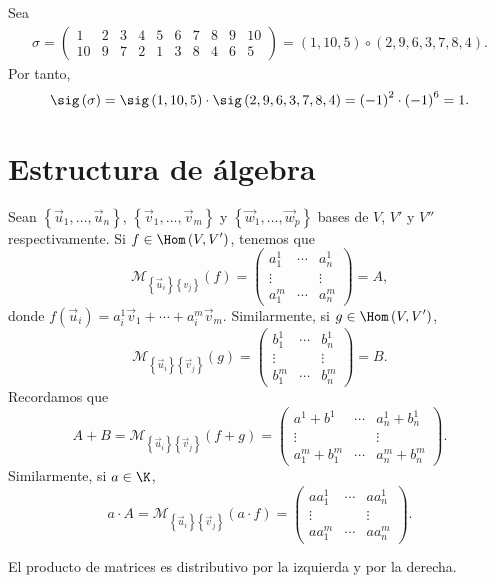 \begin{eg}
\normalfont Sea
\[
\begin{split}
	\sigma = \begin{pmatrix} 1 & 2 & 3 & 4 & 5 & 6 & 7 & 8 & 9 & 10 \\
	10 & 9 & 7 & 2 & 1 & 3 & 8 & 4 & 6 & 5\end{pmatrix} = \left(1, 10, 5\right) \circ \left(2, 9, 6, 3, 7, 8, 4\right) .
\end{split}
\]
Por tanto, 
\[\sig\left(\sigma \right) = \sig\left(1, 10, 5\right) \cdot \sig\left(2, 9, 6, 3, 7, 8, 4\right) = \left(-1\right)^{2} \cdot \left(-1\right)^{6} = 1 .\]
\end{eg}

\section{Estructura de álgebra}

Sean $\displaystyle \left\{ \vec{u}_{1}, \ldots, \vec{u}_{n}\right\}  $, $\displaystyle \left\{ \vec{v}_{1}, \ldots, \vec{v}_{m}\right\}  $ y $\displaystyle \left\{ \vec{w}_{1}, \ldots, \vec{w}_{p}\right\}  $ bases de $\displaystyle V$, $\displaystyle V' $ y $\displaystyle V'' $ respectivamente. Si $\displaystyle f \in \Hom\left(V, V'\right) $, tenemos que 
\[\mathcal{M}_{ \left\{ \vec{u}_{i}\right\} \left\{ v_{j}\right\} }\left(f\right) = \begin{pmatrix} a^{1}_{1} & \cdots & a^{1}_{n} \\
\vdots & & \vdots \\
a^{m}_{1} & \cdots & a^{m}_{n}\end{pmatrix} = A ,\]
donde $\displaystyle f\left(\vec{u}_{i}\right) = a^{1}_{i} \vec{v}_{1} + \cdots + a^{m}_{i}\vec{v}_{m} $. Similarmente, si $\displaystyle g \in \Hom\left(V,V'\right) $, 
	\[\mathcal{M}_{ \left\{ \vec{u}_{i}\right\} \left\{ \vec{v}_{j}\right\} }\left(g\right) = \begin{pmatrix} b^{1}_{1} & \cdots & b^{1}_{n} \\
	\vdots & & \vdots \\
b^{m}_{1} & \cdots & b^{m}_{n}\end{pmatrix} = B .\]
Recordamos que 
		\[A + B = \mathcal{M}_{ \left\{ \vec{u}_{i}\right\} \left\{ \vec{v}_{j}\right\} }\left(f+g\right) = \begin{pmatrix} a^{1}+b^{1} & \cdots & a^{1}_{n}+b^{1}_{n} \\
		\vdots & & \vdots \\
	a^{m}_{1}+b^{m}_{1} & \cdots & a^{m}_{n} + b^{m}_{n}\end{pmatrix} .\]
Similarmente, si $\displaystyle a \in \K $, 
			\[a \cdot A = \mathcal{M}_{ \left\{ \vec{u}_{i}\right\} \left\{ \vec{v}_{j}\right\} }\left(a \cdot f\right) = \begin{pmatrix} a a^{1}_{1} & \cdots & a a ^{1}_{n} \\
				\vdots & & \vdots \\
			a a^{m}_{1} & \cdots & a a ^{m}_{n}\end{pmatrix} .\]
\begin{fprop}[]
\normalfont El producto de matrices es distributivo por la izquierda y por la derecha.
\end{fprop}

